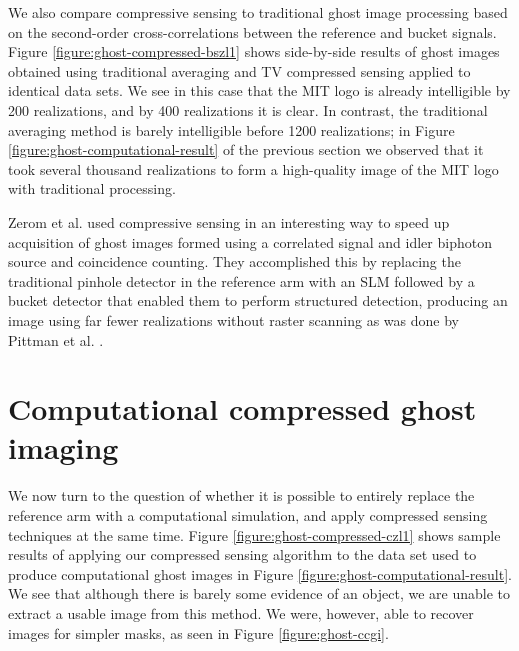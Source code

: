 We also compare compressive sensing to traditional ghost image processing based on the second-order cross-correlations between the reference and bucket signals. Figure \ref{figure:ghost-compressed-bszl1} shows side-by-side results of ghost images obtained using traditional averaging and TV compressed sensing applied to identical data sets. We see in this case that the MIT logo is already intelligible by 200 realizations, and by 400 realizations it is clear. In contrast, the traditional averaging method is barely intelligible before 1200 realizations; in Figure \ref{figure:ghost-computational-result} of the previous section we observed that it took several thousand realizations to form a high-quality image of the MIT logo with traditional processing.

Zerom et al. \cite{zerom-entangled} used compressive sensing in an interesting way to speed up acquisition of ghost images formed using a correlated signal and idler biphoton source and coincidence counting. They accomplished this by replacing the traditional pinhole detector in the reference arm with an SLM followed by a bucket detector that enabled them to perform structured detection, producing an image using far fewer realizations without raster scanning as was done by Pittman et al. \cite{pittman-ghost}.

\section{Computational compressed ghost imaging}
\label{section:ghost-cc}

We now turn to the question of whether it is possible to entirely replace the reference arm with a computational simulation, and apply compressed sensing techniques at the same time. Figure \ref{figure:ghost-compressed-czl1} shows sample results of applying our compressed sensing algorithm to the data set used to produce computational ghost images in Figure \ref{figure:ghost-computational-result}. We see that although there is barely some evidence of an object, we are unable to extract a usable image from this method. We were, however, able to recover images for simpler masks, as seen in Figure \ref{figure:ghost-ccgi}.

